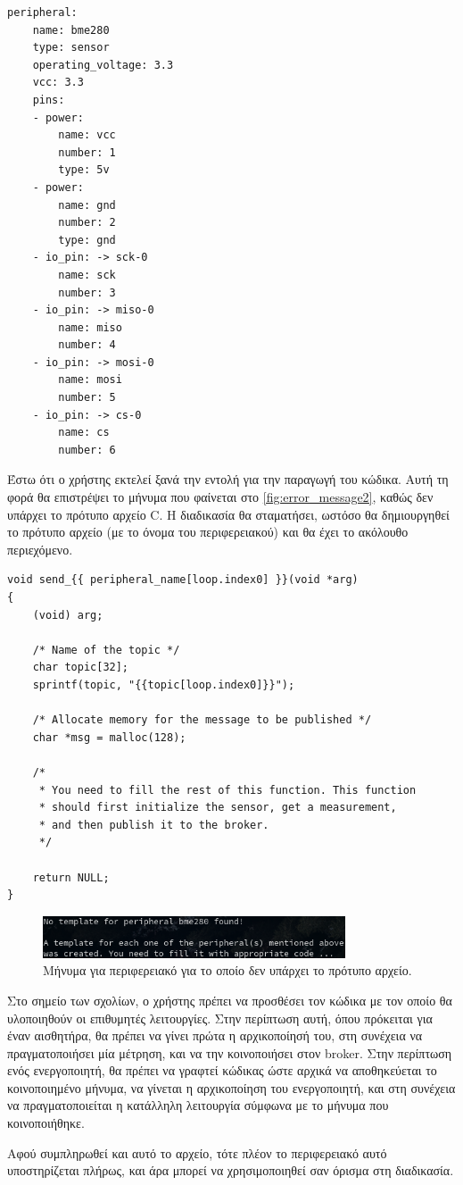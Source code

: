 \begin{lstlisting}
peripheral:
	name: bme280
	type: sensor
	operating_voltage: 3.3
	vcc: 3.3
	pins:
	- power:
		name: vcc
		number: 1
		type: 5v
	- power:
		name: gnd
		number: 2
		type: gnd
	- io_pin: -> sck-0
		name: sck
		number: 3
	- io_pin: -> miso-0
		name: miso
		number: 4
	- io_pin: -> mosi-0
		name: mosi
		number: 5
	- io_pin: -> cs-0
		name: cs
		number: 6
\end{lstlisting}

Έστω ότι ο χρήστης εκτελεί ξανά την εντολή για την παραγωγή του κώδικα. Αυτή τη φορά θα επιστρέψει το μήνυμα που φαίνεται στο \autoref{fig:error_message2}, καθώς δεν υπάρχει το πρότυπο αρχείο C. Η διαδικασία θα σταματήσει, ωστόσο θα δημιουργηθεί το πρότυπο αρχείο (με το όνομα του περιφερειακού) και θα έχει το ακόλουθο περιεχόμενο.

\begin{lstlisting}
void send_{{ peripheral_name[loop.index0] }}(void *arg)
{
	(void) arg;
	
	/* Name of the topic */
	char topic[32];
	sprintf(topic, "{{topic[loop.index0]}}");
	
	/* Allocate memory for the message to be published */
	char *msg = malloc(128);
	
	/*
	 * You need to fill the rest of this function. This function 
	 * should first initialize the sensor, get a measurement,
	 * and then publish it to the broker. 
	 */
	
	return NULL;
}
\end{lstlisting}

\begin{figure}[!ht]
	\centering
	\includegraphics[width=0.8\textwidth]{./images/chapter6/error_message2.png}
	\caption{Μήνυμα για περιφερειακό για το οποίο δεν υπάρχει το πρότυπο αρχείο.}
	\label{fig:error_message2}
\end{figure}

Στο σημείο των σχολίων, ο χρήστης πρέπει να προσθέσει τον κώδικα με τον οποίο θα υλοποιηθούν οι επιθυμητές λειτουργίες. Στην περίπτωση αυτή, όπου πρόκειται για έναν αισθητήρα, θα πρέπει να γίνει πρώτα η αρχικοποίησή του, στη συνέχεια να πραγματοποιήσει μία μέτρηση, και να την κοινοποιήσει στον broker. Στην περίπτωση ενός ενεργοποιητή, θα πρέπει να γραφτεί κώδικας ώστε αρχικά να αποθηκεύεται το κοινοποιημένο μήνυμα, να γίνεται η αρχικοποίηση του ενεργοποιητή, και στη συνέχεια να πραγματοποιείται η κατάλληλη λειτουργία σύμφωνα με το μήνυμα που κοινοποιήθηκε.

Αφού συμπληρωθεί και αυτό το αρχείο, τότε πλέον το περιφερειακό αυτό υποστηρίζεται πλήρως, και άρα μπορεί να χρησιμοποιηθεί σαν όρισμα στη διαδικασία.
